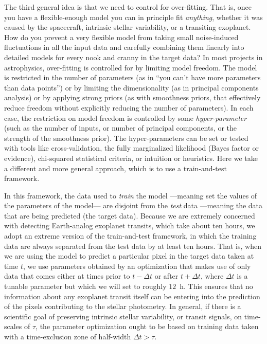 \documentclass[12pt, preprint]{aastex}
\begin{document}
The third general idea is that we need to control for over-fitting.
That is, once you have a flexible-enough model you can in principle fit \emph{anything},
  whether it was caused by the spacecraft, intrinsic stellar variability, or a transiting exoplanet.
How do you prevent a very flexible model from taking small noise-induced fluctuations in all the input data
  and carefully combining them linearly into detailed models for every nook and cranny in the target data?
In most projects in astrophysics, over-fitting is controlled for by limiting model freedom.
The model is restricted in the number of parameters
  (as in ``you can't have more parameters than data points'')
  or by limiting the dimensionality
  (as in principal components analysis)
  or by applying strong priors
  (as with smoothness priors, that effectively reduce freedom without explicitly reducing the number of parameters).
In each case, the restriction on model freedom is controlled by some \emph{hyper-parameter}
  (such as the number of inputs, or number of principal components, or the strength of the smoothness prior).
The hyper-parameters can be set or tested with tools like cross-validation,
  the fully marginalized likelihood (Bayes factor or evidence),
  chi-squared statistical criteria,
  or intuition or heuristics.
Here we take a different and more general approach, which is to use a train-and-test framework.

In this framework, the data used to \emph{train} the model%
  ---meaning set the values of the parameters of the model---%
  are disjoint from the \emph{test} data
  ---meaning the data that are being predicted (the target data).
Because we are extremely concerned with detecting Earth-analog exoplanet transits,
  which take about ten hours,
  we adopt an extreme version of the train-and-test framework,
  in which the training data are always separated from the test data by at least ten hours.
That is, when we are using the model to predict a particular pixel in the target data taken at time $t$,
  we use parameters obtained by an optimization that makes use of only data
  that comes either at times prior to $t-\Delta t$ or after $t+\Delta t$,
  where $\Delta t$ is a tunable parameter but which we will set to roughly $12$~h.
This ensures that no information about any exoplanet transit itself
  can be entering into the prediction of the pixels contributing to the stellar photometry.
In general, if there is a scientific goal of preserving intrinsic stellar variability,
  or transit signals,
  on time-scales of $\tau$,
  the parameter optimization ought to be based on training data taken with a time-exclusion zone of half-width $\Delta t > \tau$.
\end{document}
